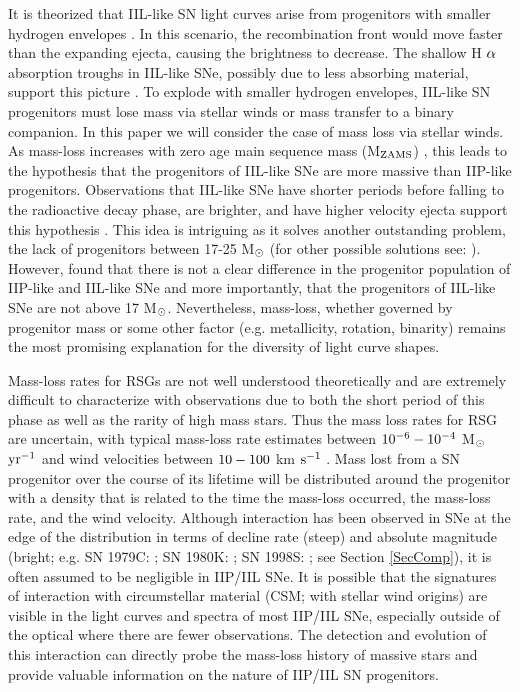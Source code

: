 \documentclass[a4paper,fleqn,usenatbib]{mnras}
\newcommand{\msun}{M$\rm{_{\odot}}$ }
\newcommand{\msunperiod}{M$\rm{_{\odot}}$}
\begin{document}
It is theorized that IIL-like SN light curves arise from progenitors with  smaller hydrogen envelopes \citep{1971grassberg,1989branch,1993blinnikov}.
In this scenario, the recombination front would move faster than the expanding ejecta, causing the brightness to decrease. 
The shallow H $\rm{\alpha}$ absorption troughs in IIL-like SNe, possibly due to less absorbing material, support this picture \citep{1996schlegel,2014gutierrez}.
To explode with smaller hydrogen envelopes, IIL-like SN progenitors must lose mass via stellar winds or mass transfer to a binary companion.
In this paper we will consider the case of mass loss via stellar winds.
As mass-loss increases with zero age main sequence mass (M$\rm{_{ZAMS}}$)  \citep{2003heger,2009kasen}, this leads to the hypothesis that the progenitors of IIL-like SNe are more massive than IIP-like progenitors. 
Observations that IIL-like SNe have shorter periods before falling to the radioactive decay phase, are brighter, and have higher velocity ejecta support this hypothesis \citep{1994patat,2014gutierrez,2014anderson,2014faran,2015sanders,2015valenti,2016valenti}.
This idea is intriguing as it solves another outstanding problem, the lack of progenitors between 17-25 \msun \citep{2015smartt2} (for other possible solutions see: \citealt{2018davies, 2012walmswell}).
However, \citet{2016valenti} found that there is not a clear difference in the progenitor population of IIP-like and IIL-like SNe and more importantly, that the progenitors of IIL-like SNe are not above 17 \msunperiod.
Nevertheless, mass-loss, whether governed by progenitor mass or some other factor (e.g. metallicity, rotation, binarity) remains the most promising explanation for the diversity of light curve shapes.

Mass-loss rates for RSGs are not well understood theoretically and are extremely difficult to characterize with observations due to both the short period of this phase as well as the rarity of high mass stars.
Thus the mass loss rates for RSG are uncertain, with typical mass-loss rate estimates between $\rm{10^{-6}-10^{-4}}$ \msunperiod $\rm{yr^{-1}}$ and wind velocities between $\rm{10-100}$ km $\rm{s^{-1}}$ \citep{2011mauron}.
Mass lost from a SN progenitor over the course of its lifetime will be distributed around the progenitor with a density that is related to the time the mass-loss occurred, the mass-loss rate, and the wind velocity.
Although interaction has been observed in SNe at the edge of the distribution in terms of decline rate (steep) and absolute magnitude (bright; e.g. SN 1979C: \citealt{1993blinnikov}; SN 1980K: \citealt{1992chugai}; SN 1998S: \citealt{2001chugai}; see Section \ref{SecComp}), it is often assumed to be negligible in IIP/IIL SNe.
It is possible that the signatures of interaction with circumstellar material (CSM; with stellar wind origins) are visible in the light curves and spectra of most IIP/IIL SNe, especially outside of the optical where there are fewer observations.
The detection and evolution of this interaction can directly probe the mass-loss history of massive stars and provide valuable information on the nature of IIP/IIL SN progenitors.
\end{document}
